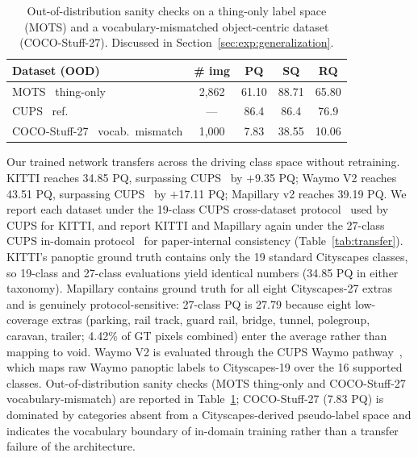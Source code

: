 \documentclass[10pt,twocolumn,letterpaper]{article}
\begin{document}
\begin{table}[t]
\centering
\footnotesize
\setlength{\tabcolsep}{3pt}
\begin{tabular}{l c c c c}
\toprule
Dataset (OOD) & \# img & PQ & SQ & RQ \\
\midrule
MOTS~\cite{voigtlaender2019mots} thing-only & 2{,}862 & 61.10 & 88.71 & 65.80 \\
\quad CUPS~\cite{hahn2025cups} ref. & --- & 86.4 & 86.4 & 76.9 \\
COCO-Stuff-27~\cite{caesar2018coco} vocab.\ mismatch & 1{,}000 & \phantom{0}7.83 & 38.55 & 10.06 \\
\bottomrule
\end{tabular}
\caption{Out-of-distribution sanity checks on a thing-only label space (MOTS) and a vocabulary-mismatched object-centric dataset (COCO-Stuff-27). Discussed in Section~\ref{sec:exp:generalization}.}
\label{tab:cocooo}
\end{table}

Our trained network transfers across the driving class space without retraining. KITTI reaches 34.85 PQ, surpassing CUPS~\cite{hahn2025cups} by $+$9.35 PQ; Waymo V2 reaches 43.51 PQ, surpassing CUPS~\cite{hahn2025cups} by $+$17.11 PQ; Mapillary v2 reaches 39.19 PQ. We report each dataset under the 19-class CUPS cross-dataset protocol~\cite{hahn2025cups} used by CUPS for KITTI, and report KITTI and Mapillary again under the 27-class CUPS in-domain protocol~\cite{hahn2025cups} for paper-internal consistency (Table~\ref{tab:transfer}). KITTI's panoptic ground truth contains only the 19 standard Cityscapes classes, so 19-class and 27-class evaluations yield identical numbers (34.85 PQ in either taxonomy). Mapillary contains ground truth for all eight Cityscapes-27 extras and is genuinely protocol-sensitive: 27-class PQ is 27.79 because eight low-coverage extras (parking, rail track, guard rail, bridge, tunnel, polegroup, caravan, trailer; 4.42\% of GT pixels combined) enter the average rather than mapping to void. Waymo V2 is evaluated through the CUPS Waymo pathway~\cite{hahn2025cups}, which maps raw Waymo panoptic labels to Cityscapes-19 over the 16 supported classes. Out-of-distribution sanity checks (MOTS thing-only and COCO-Stuff-27 vocabulary-mismatch) are reported in Table~\ref{tab:cocooo}; COCO-Stuff-27 (7.83 PQ) is dominated by categories absent from a Cityscapes-derived pseudo-label space and indicates the vocabulary boundary of in-domain training rather than a transfer failure of the architecture.
\end{document}
